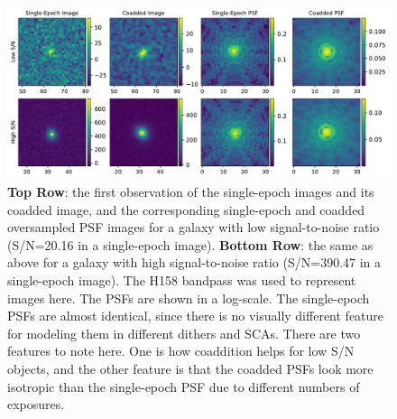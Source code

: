 \documentclass[fleqn,usenatbib]{mnras}
\begin{document}
\begin{figure}
	\includegraphics[width=\textwidth]{lowsnr_highsnr_galaxies_v2.pdf}
    \caption{\textbf{Top Row}: the first observation of the single-epoch images and its coadded image, and the corresponding single-epoch and coadded oversampled PSF images for a galaxy with low signal-to-noise ratio (S/N=20.16 in a single-epoch image). \textbf{Bottom Row}: the same as above for a galaxy with high signal-to-noise ratio (S/N=390.47 in a single-epoch image). The H158 bandpass was used to represent images here. The PSFs are shown in a log-scale. The single-epoch PSFs are almost identical, since there is no visually different feature for modeling them in different dithers and SCAs. There are two features to note here. One is how coaddition helps for low S/N objects, and the other feature is that the coadded PSFs look more isotropic than the single-epoch PSF due to different numbers of exposures.}
    \label{fig:singlecoadd}
\end{figure}
\end{document}

